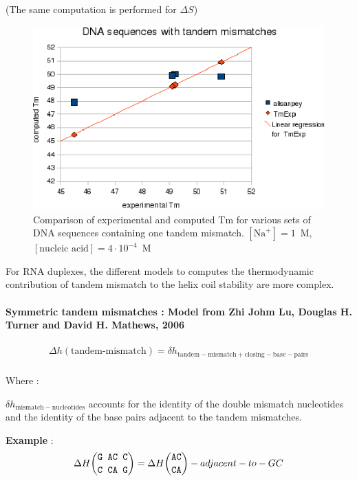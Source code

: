 \documentclass{article}
\begin{document}
       (The same computation is performed for $\Delta S$) 

\begin{figure}[h]
\includegraphics[width=1\linewidth]{images/DNATandemMismatch}
\caption{Comparison of experimental and computed Tm for various sets of
 DNA sequences containing one tandem mismatch. $[\mbox{Na}^+] = 1$~M, $[\mbox{nucleic acid}] = 4\cdot{}10^{-4}$~M}
\end{figure}

For RNA duplexes, the different models to computes the thermodynamic contribution of tandem mismatch to the helix coil 
stability are more complex.

\paragraph{Symmetric tandem mismatches : \textbf{Model from Zhi Johm Lu, Douglas H. Turner and David H. Mathews, 2006}}

\begin{multline*}
\Delta h {(\mbox{tandem-mismatch})} = 
\delta{}h_\mathrm{tandem-mismatch+closing-base-pairs} \\
\end{multline*}

Where :

$\delta{}h_\mathrm{mismatch-nucleotides}$ accounts for the identity of the double mismatch nucleotides and the identity of the base pairs
adjacent to the tandem mismatches.

\textbf{Example} :
\begin{multline*}
\Delta H {\mbox{\texttt{G AC C}} \choose \mbox{\texttt{C CA G}}} = 
\Delta H {\mbox{\texttt{AC}} \choose \mbox{\texttt{CA}}} -adjacent-to-GC\\
\end{multline*}
\end{document}
